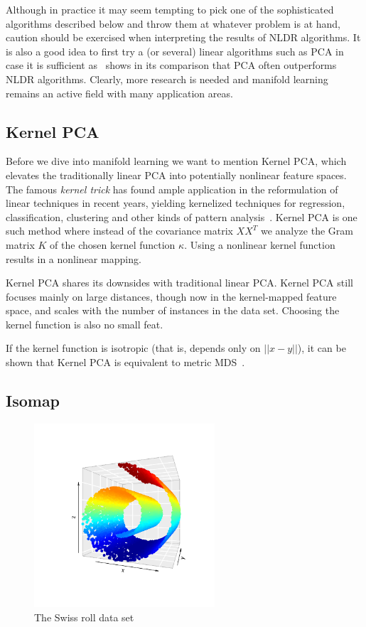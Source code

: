 Although in practice it may seem tempting to pick one of the sophisticated
algorithms described below and throw them at whatever problem is at hand,
caution should be exercised when interpreting the results of NLDR algorithms.
It is also a good idea to first try a (or several) linear algorithms such as
PCA in case it is sufficient as~\cite{vandermaaten_review} shows in its
comparison that PCA often outperforms NLDR algorithms. Clearly, more research
is needed and manifold learning remains an active field with many application
areas.

\subsection{Kernel PCA}

Before we dive into manifold learning we want to mention Kernel PCA, which
elevates the traditionally linear PCA into potentially nonlinear feature
spaces.
The famous \emph{kernel trick} has found ample application in the reformulation
of linear techniques in recent years, yielding kernelized techniques for regression, classification,
clustering and other kinds of pattern analysis~\cite{kernel_methods}. Kernel PCA is one such method
where instead of the covariance matrix $XX^T$ we analyze the Gram matrix $K$ of the chosen
kernel function $\kappa$. Using a nonlinear kernel function results in a nonlinear mapping.

Kernel PCA shares its downsides with traditional linear PCA. Kernel PCA still focuses mainly
on large distances, though now in the kernel-mapped feature space, and scales with
the number of instances in the data set. Choosing the kernel function is also no small
feat.

If the kernel function is isotropic (that is, depends only on $||x - y||$), it can be
shown that Kernel PCA is equivalent to metric MDS~\cite{kernel_pca_metric_mds}.

\vfill

\subsection{Isomap}

\begin{figure}[t]
    \centering
    \includegraphics[width=0.6\textwidth]{img/swissroll}
    \caption{The Swiss roll data set}
    \label{fig:swiss}
\end{figure}

